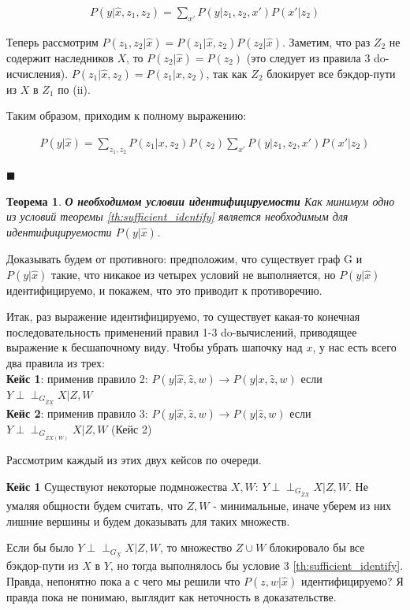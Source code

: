 \documentclass[fleqn]{article}
\newcommand{\independent}{\perp \!\!\! \perp}
\newtheorem{theorem}{Теорема}
\numberwithin{equation}{section}
\numberwithin{theorem}{section}
\numberwithin{figure}{section}
\numberwithin{lemma}{section}
\begin{document}
\begin{align}
	P(y|\hat x, z_1, z_2) = \sum\limits_{x'} P(y|z_1, z_2, x')P(x'|z_2)
\end{align}

Теперь рассмотрим $P(z_1, z_2 | \hat x) = P(z_1 | \hat x, z_2) P(z_2 | \hat x)$. Заметим, что раз $Z_2$ не содержит наследников $X$, то $P(z_2|\hat x) = P(z_2)$ (это следует из правила 3 do-исчисления). $P(z_1 | \hat x, z_2) = P(z_1 |  x, z_2)$, так как  $Z_2$ блокирует все бэкдор-пути из $X$ в $Z_1$ по (ii). 

Таким образом, приходим к полному выражению:

\begin{align}
	P(y|\hat x) = \sum\limits_{z_1,z_2}P(z_1|x, z_2)P(z_2)\sum\limits_{x'} P(y|z_1, z_2, x')P(x'|z_2)
\end{align}

$\blacksquare$

\begin{theorem}
	\textbf{О необходимом условии идентифицируемости} Как минимум одно из условий теоремы \ref{th:sufficient_identify} является необходимым для идентифицируемости $P(y|\hat x)$. 
\end{theorem}

Доказывать будем от противного: предположим, что существует граф G и $P(y|\hat x)$ такие, что никакое из четырех условий не выполняется, но $P(y|\hat x)$ идентифицируемо, и покажем, что это приводит к противоречию.


Итак, раз выражение идентифицируемо, то существует какая-то конечная последовательность применений правил 1-3 do-вычислений, приводящее выражение к бесшапочному виду. Чтобы убрать шапочку над $x$, у нас есть всего два правила из трех:\\
\textbf{Кейс 1}: применив правило 2: $P(y|\hat x, \hat z, w) \to P(y|x, \hat z, w)$ если $Y \independent_{G_{\overline Z \underline{X}}} X | Z, W$ \\
\textbf{Кейс 2}: применив правило 3: $P(y|\hat x, \hat z, w) \to P(y|\hat z, w)$ если $Y \independent_{G_{\overline{Z}\overline{X(W)}}} X | Z, W$ (Кейс 2)

Рассмотрим каждый из этих двух кейсов по очереди.

\textbf{Кейс 1}
Существуют некоторые подмножества $X,W$: $Y \independent_{G_{\overline Z \underline{X}}} X | Z, W$. Не умаляя общности будем считать, что $Z, W$ - минимальные, иначе уберем из них лишние вершины и будем доказывать для таких множеств. 

Если бы было $Y \independent_{G_{\underline{X}}} X | Z, W$, то множество $Z \cup W$ блокировало бы все бэкдор-пути из $X$ в $Y$, но тогда выполнялось бы условие 3 \ref{th:sufficient_identify}. Правда, непонятно пока а с чего мы решили что $P(z,w | \hat x)$ идентифицируемо? Я правда пока не понимаю, выглядит как неточность в доказательстве. 
\end{document}
